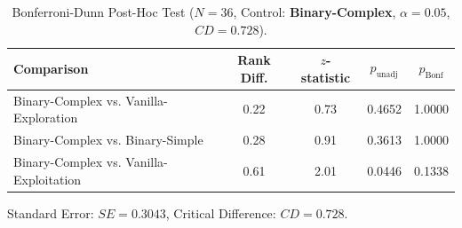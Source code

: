 \begin{table}[htbp]
  \centering
  \small
  \caption{Bonferroni-Dunn Post-Hoc Test ($N=36$, Control: \textbf{Binary-Complex}, $\alpha=0.05$, $CD=0.728$).}
  \label{tab:bonferroni_posthoc_inst0}
  \begin{tabular}{lcccc}
    \toprule
    \textbf{Comparison} & \textbf{Rank Diff.} & \textbf{$z$-statistic} & \textbf{$p_{\text{unadj}}$} & \textbf{$p_{\text{Bonf}}$} \\
    \midrule
    Binary-Complex vs. Vanilla-Exploration &   0.22 &  0.73 &  0.4652 &  1.0000 \\
    Binary-Complex vs. Binary-Simple       &   0.28 &  0.91 &  0.3613 &  1.0000 \\
    Binary-Complex vs. Vanilla-Exploitation &   0.61 &  2.01 &  0.0446 &  0.1338 \\
    \bottomrule
  \end{tabular}
  \vspace{1ex}

  \footnotesize Standard Error: $SE=0.3043$, Critical Difference: $CD=0.728$.
\end{table}
